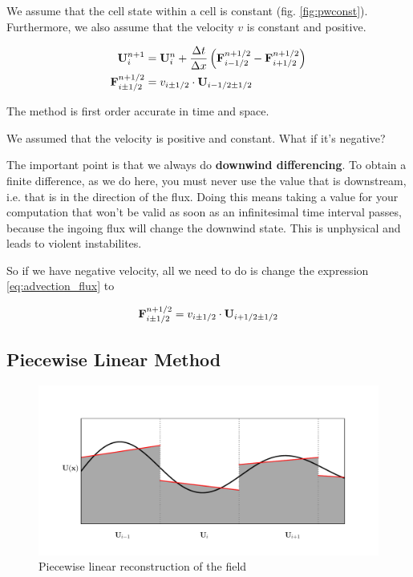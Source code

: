 We assume that the cell state within a cell is constant (fig. \ref{fig:pwconst}).
Furthermore, we also assume that the velocity $v$ is constant and positive.


\begin{align}
	\mathbf{U}_i ^{n+1} &= 
		\mathbf{U}_i^{n} +  \frac{\Delta t}{\Delta x} \left( \mathbf{F}_{i-1/2}^{n+1/2} - \mathbf{F}_{i+1/2}^{n+1/2} \right) \label{eq:advection_basic}\\ 
	\mathbf{F}_{i\pm1/2}^{n+1/2} &= v_{i\pm1/2}\cdot \mathbf{U}_{i - 1/2 \pm 1/2} \label{eq:advection_flux}
\end{align}

The method is first order accurate in time and space.





We assumed that the velocity is positive and constant.
What if it's negative?

The important point is that we always do \textbf{downwind differencing}.
To obtain a finite difference, as we do here, you must never use the value that is downstream, i.e. that is in the direction of the flux.
Doing this means taking a value for your computation that won't be valid as soon as an infinitesimal time interval passes, because the ingoing flux will change the downwind state.
This is unphysical and leads to violent instabilites.

So if we have negative velocity, all we need to do is change the expression \ref{eq:advection_flux} to

\begin{equation}
	\mathbf{F}_{i\pm1/2}^{n+1/2} = v_{i\pm1/2}\cdot \mathbf{U}_{i + 1/2 \pm 1/2}
\end{equation}









\subsection{Piecewise Linear Method}

\begin{figure}[htbp]
	\includegraphics[width=\textwidth]{./figures/piecewise_linear.pdf}%
	\caption{Piecewise linear reconstruction of the field
		\label{fig:pwlin}
	}
\end{figure}



